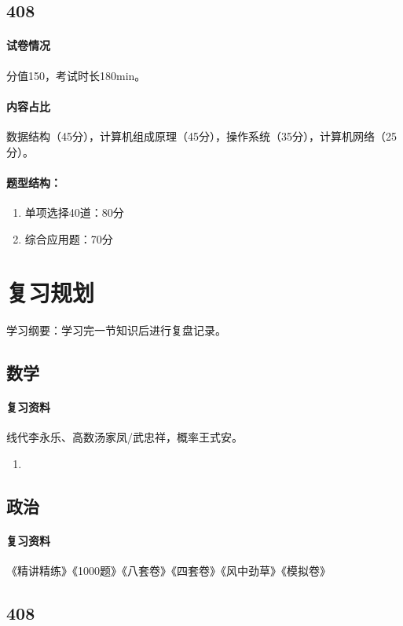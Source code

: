 \subsection{408}
\paragraph{试卷情况} 分值150，考试时长180min。
\paragraph{内容占比} 数据结构（45分），计算机组成原理（45分），操作系统（35分），计算机网络（25分）。
\paragraph{题型结构：}
\begin{enumerate}
    \item 单项选择40道：80分
    \item 综合应用题：70分
\end{enumerate}

\section{复习规划}
学习纲要：学习完一节知识后进行复盘记录。

\subsection{数学}
\paragraph{复习资料} 线代李永乐、高数汤家凤/武忠祥，概率王式安。

\begin{enumerate}
    \item
\end{enumerate}

\subsection{政治}
\paragraph{复习资料} 《精讲精练》《1000题》《八套卷》《四套卷》《风中劲草》《模拟卷》

\subsection{408}
